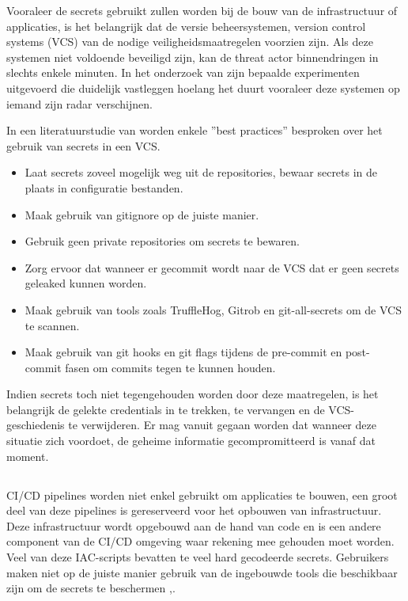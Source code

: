 Vooraleer de secrets gebruikt zullen worden bij de bouw van de infrastructuur of applicaties, is het belangrijk dat de versie beheersystemen, version control systems (VCS) van de nodige veiligheidsmaatregelen voorzien zijn. Als deze systemen niet voldoende beveiligd zijn, kan de threat actor binnendringen in slechts enkele minuten. In het onderzoek van \autocite{Mouw2021} zijn bepaalde experimenten uitgevoerd die duidelijk vastleggen hoelang het duurt vooraleer deze systemen op iemand zijn radar verschijnen.
\newline 

In een literatuurstudie van \textcite{Basak2023} worden enkele ''best practices'' besproken over het gebruik van secrets in een VCS. 

\begin{itemize}
  \item Laat secrets zoveel mogelijk weg uit de repositories, bewaar secrets in de plaats in configuratie bestanden.
  \item Maak gebruik van gitignore op de juiste manier.
  \item Gebruik geen private repositories om secrets te bewaren.
  \item Zorg ervoor dat wanneer er gecommit wordt naar de VCS dat er geen secrets geleaked kunnen worden.
  \item Maak gebruik van tools zoals TruffleHog, Gitrob en git-all-secrets om de VCS te scannen.
  \item Maak gebruik van git hooks en git flags tijdens de pre-commit en post-commit fasen om commits tegen te kunnen houden.
\end{itemize}
\clearpage

Indien secrets toch niet tegengehouden worden door deze maatregelen, is het belangrijk de gelekte credentials in te trekken, te vervangen en de VCS-geschiedenis te verwijderen. Er mag vanuit gegaan worden dat wanneer deze situatie zich voordoet, de geheime informatie gecompromitteerd is vanaf dat moment.

\subsection{}%
\label{sec:Secrets in infrastructure as code en secrets beheer}
CI/CD pipelines worden niet enkel gebruikt om applicaties te bouwen, een groot deel van deze pipelines is gereserveerd voor het opbouwen van infrastructuur. Deze infrastructuur wordt opgebouwd aan de hand van code en is een andere component van de CI/CD omgeving waar rekening mee gehouden moet worden. Veel van deze IAC-scripts bevatten te veel hard gecodeerde secrets. Gebruikers maken niet op de juiste manier gebruik van de ingebouwde tools die beschikbaar zijn om de secrets te beschermen \autocite{Rahman2019},\autocite{Kumara2021}.
\newline

